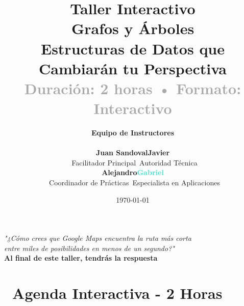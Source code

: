 \documentclass[12pt,a4paper]{article}
\title{
	\vspace{-1.5cm}
	{\Huge\textbf{\textcolor{primaryblue}{Taller Interactivo}}}\\[0.3cm]
	{\LARGE\textbf{\textcolor{secondarygreen}{Grafos y Árboles}}}\\[0.5cm]
	{\Large Estructuras de Datos que Cambiarán tu Perspectiva}\\[0.3cm]
	{\large \textcolor{darkgray}{Duración: 2 horas • Formato: Interactivo}}
}
\author{
	\begin{tcolorbox}[colback=primaryblue!10, colframe=primaryblue, rounded corners]
		\centering
		\textbf{\Large Equipo de Instructores}\\[0.5cm]
		\begin{tabular}{cc}
			\textbf{\textcolor{primaryblue}{Juan Sandoval}} & \textbf{\textcolor{secondarygreen}{Javier}} \\
			\faLightbulb\ Facilitador Principal & \faCode\ Autoridad Técnica \\[0.5cm]
			\textbf{\textcolor{warningorange}{Alejandro}} & \textbf{\textcolor{turquoise}{Gabriel}} \\
			\faTools\ Coordinador de Prácticas & \faGlobe\ Especialista en Aplicaciones
		\end{tabular}
	\end{tcolorbox}
}
\date{\today}
\begin{document}
	
	\maketitle
	\thispagestyle{empty}
	
	\vfill
	\begin{center}
		\begin{tcolorbox}[colback=secondarygreen!10, colframe=secondarygreen, rounded corners, width=0.8\textwidth]
			\centering
			\Large\textit{"¿Cómo crees que Google Maps encuentra la ruta más corta\\
				entre miles de posibilidades en menos de un segundo?"}\\[0.3cm]
			\normalsize\textbf{Al final de este taller, tendrás la respuesta}
		\end{tcolorbox}
	\end{center}
	\vfill
	
	\newpage
	
	\section*{\faClock\ Agenda Interactiva - 2 Horas}
	
\end{document}
